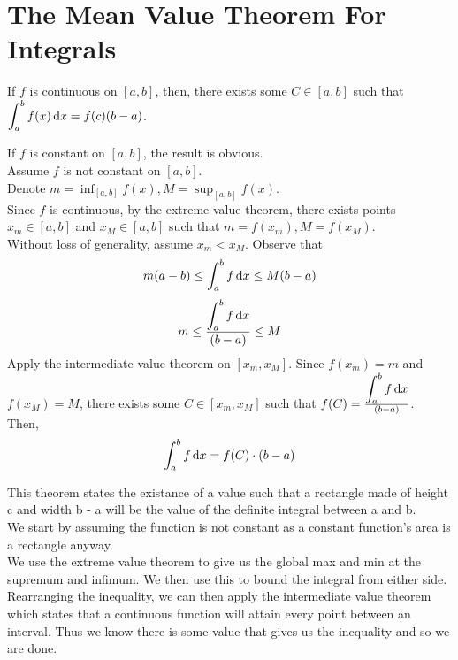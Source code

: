\documentclass[12pt]{article}
\begin{document}
\section{The Mean Value Theorem For Integrals}
\begin{theo}{}
If \(f\) is continuous on \([a, b]\), then, there exists some \(C \in [a, b]\) such that \(\displaystyle\int_a^b f(x) \,\mathrm{d} x = f(c)(b-a)\).    
\end{theo}
\newpage
\begin{prf}{}
If \(f\) is constant on \([a, b]\), the result is obvious.\\
Assume \(f\) is not constant on \([a, b]\).\\
Denote \(m  = \displaystyle\inf_{[a, b]}f(x), M = \displaystyle\sup_{[a, b]}f(x)\).\\
Since \(f\) is continuous, by the extreme value theorem, there exists points \(x_m \in [a, b]\) and \(x_M \in [a, b]\) such that \(m = f(x_m), M = f(x_M)\).\\
Without loss of generality, assume \(x_m < x_M\). Observe that 
\[m(a-b) \le \displaystyle\int_a^b f\,\mathrm{d} x \le M(b-a)\]
\[m \le \frac{\displaystyle\int_a^b f\,\mathrm{d} x}{(b - a)} \le M\]
Apply the intermediate value theorem on \([x_m, x_M]\). Since \(f(x_m) = m\) and \(f(x_M) = M\), there exists some \(C \in [x_m, x_M]\) such that \(f(C) = \frac{\displaystyle\int_a^b f\,\mathrm{d} x}{(b-a)}\).\\
Then, \[\displaystyle\int_a^b f\,\mathrm{d} x = f(C)\cdot (b - a)\]
\end{prf}
\begin{explanation}
    This theorem states the existance of a value such that a rectangle made of height c and width b - a will be the value of the definite integral between a and b.\\
We start by assuming the function is not constant as a constant function's area is a rectangle anyway.\\
We use the extreme value theorem to give us the global max and min at the supremum and infimum. We then use this to bound the integral from either side. Rearranging the inequality, we can then apply the intermediate value theorem which states that a continuous function will attain every point between an interval. Thus we know there is some value that gives us the inequality and so we are done.\\
\end{explanation}
\end{document}
